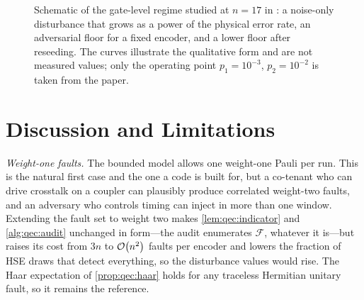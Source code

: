 \begin{figure}[htbp]
\centering
{}
\caption{Schematic of the gate-level regime studied at $n=17$ in \cite{guo2026qecaudit}: a noise-only disturbance that grows as a power of the physical error rate, an adversarial floor for a fixed encoder, and a lower floor after reseeding. The curves illustrate the qualitative form and are not measured values; only the operating point $p_1=10^{-3}$, $p_2=10^{-2}$ is taken from the paper.}
\label{fig:qec:stim}
\end{figure}

\section{Discussion and Limitations}\label{sec:qec:discussion}

\emph{Weight-one faults.} The bounded model allows one weight-one Pauli per run. This is the natural first case and the one a code is built for, but a co-tenant who can drive crosstalk on a coupler can plausibly produce correlated weight-two faults, and an adversary who controls timing can inject in more than one window. Extending the fault set to weight two makes \cref{lem:qec:indicator} and \cref{alg:qec:audit} unchanged in form---the audit enumerates $\mathcal{F}$, whatever it is---but raises its cost from $3n$ to $\mathcal{O}\!\left(n^{2}\right)$ faults per encoder and lowers the fraction of HSE draws that detect everything, so the disturbance values would rise. The Haar expectation of \cref{prop:qec:haar} holds for any traceless Hermitian unitary fault, so it remains the reference.

